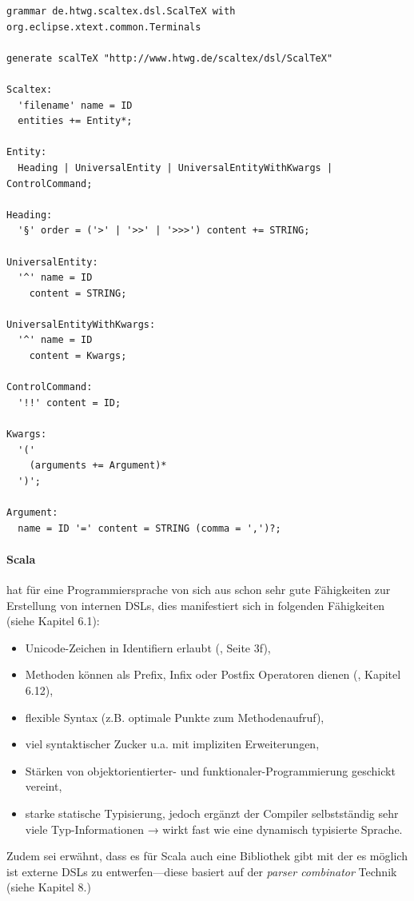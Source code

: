 \begin{lstlisting}[label=xtext-gramm,caption=An Scala-DSL angelehnte Xtext-Grammatik.]
grammar de.htwg.scaltex.dsl.ScalTeX with org.eclipse.xtext.common.Terminals

generate scalTeX "http://www.htwg.de/scaltex/dsl/ScalTeX"

Scaltex:
  'filename' name = ID
  entities += Entity*;

Entity:
  Heading | UniversalEntity | UniversalEntityWithKwargs | ControlCommand;

Heading:
  '§' order = ('>' | '>>' | '>>>') content += STRING;

UniversalEntity:
  '^' name = ID
    content = STRING;

UniversalEntityWithKwargs:
  '^' name = ID
    content = Kwargs;

ControlCommand:
  '!!' content = ID;

Kwargs:
  '('
    (arguments += Argument)*
  ')';

Argument:
  name = ID '=' content = STRING (comma = ',')?;
\end{lstlisting}

\paragraph{Scala} hat für eine Programmiersprache von sich aus schon
sehr gute Fähigkeiten zur Erstellung von internen DSLs, dies
manifestiert sich in folgenden Fähigkeiten (siehe \cite{dsls} Kapitel 6.1):

\begin{itemize}
  \item Unicode-Zeichen in Identifiern erlaubt (\cite{scala-ref}, Seite 3f),
  \item Methoden können als Prefix, Infix oder Postfix Operatoren dienen (\cite{scala-ref}, Kapitel 6.12),
  \item flexible Syntax (z.B. optimale Punkte zum Methodenaufruf),
  \item viel syntaktischer Zucker u.a. mit impliziten Erweiterungen,
  \item Stärken von objektorientierter- und funktionaler-Programmierung
        geschickt vereint,
  \item starke statische Typisierung, jedoch ergänzt der Compiler selbstständig
        sehr viele Typ-Informationen → wirkt fast wie eine dynamisch
        typisierte Sprache.
\end{itemize}

Zudem sei erwähnt, dass es für Scala auch eine Bibliothek gibt mit
der es möglich ist externe DSLs zu entwerfen---diese basiert auf der
\emph{parser combinator} Technik (siehe \cite{dsls} Kapitel 8.)


